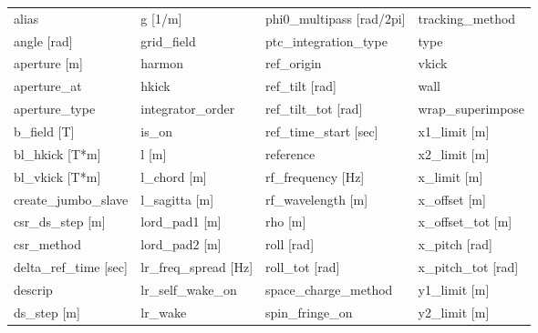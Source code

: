  \begin{tabular}{llll} \toprule
alias                            & g [1/m]                          & phi0_multipass [rad/2pi]         & tracking_method                  \\
angle [rad]                      & grid_field                       & ptc_integration_type             & type                             \\
aperture [m]                     & harmon                           & ref_origin                       & vkick                            \\
aperture_at                      & hkick                            & ref_tilt [rad]                   & wall                             \\
aperture_type                    & integrator_order                 & ref_tilt_tot [rad]               & wrap_superimpose                 \\
b_field [T]                      & is_on                            & ref_time_start [sec]             & x1_limit [m]                     \\
bl_hkick [T*m]                   & l [m]                            & reference                        & x2_limit [m]                     \\
bl_vkick [T*m]                   & l_chord [m]                      & rf_frequency [Hz]                & x_limit [m]                      \\
create_jumbo_slave               & l_sagitta [m]                    & rf_wavelength [m]                & x_offset [m]                     \\
csr_ds_step [m]                  & lord_pad1 [m]                    & rho [m]                          & x_offset_tot [m]                 \\
csr_method                       & lord_pad2 [m]                    & roll [rad]                       & x_pitch [rad]                    \\
delta_ref_time [sec]             & lr_freq_spread [Hz]              & roll_tot [rad]                   & x_pitch_tot [rad]                \\
descrip                          & lr_self_wake_on                  & space_charge_method              & y1_limit [m]                     \\
ds_step [m]                      & lr_wake                          & spin_fringe_on                   & y2_limit [m]                     \\

\end{tabular}
